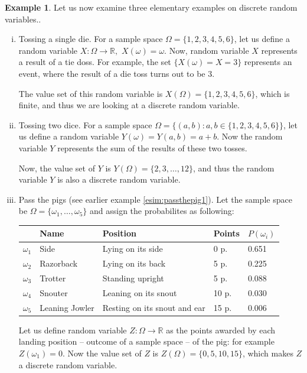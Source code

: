 \documentclass[12pt,a4paper,leqno]{report}
\newcommand{\R}{\mathbb{R}}
\theoremstyle{plain}
\theoremstyle{definition}
\newtheorem{esim}[equation]{Example}
\begin{document}
\begin{esim}
\label{discrete_rv1}
Let us now examine three elementary examples on discrete random variables.. 
\begin{enumerate}[(i)]
\item Tossing a single die. For a sample space $\Omega = \{1,2,3,4,5,6\}$, let us define a random variable $X:\Omega \rightarrow \R, \,\, X(\omega) = \omega$. Now, random variable $X$ represents a result of a tie doss. For example, the set $\lbrace X(\omega)=X=3 \rbrace$ represents an event, where the result of a die toss turns out to be $3$.

The value set of this random variable is $X(\Omega) = \{1,2,3,4,5,6\}$, which is finite, and thus we are looking at a discrete random variable.

\item Tossing two dice. For a sample space $\Omega = \{(a,b) : a,b \in \{1,2,3,4,5,6\}\}$, let us define a random variable $Y(\omega) = Y(a,b) = a + b$. Now the random variable $Y$ represents the sum of the results of these two tosses.

Now, the value set of $Y$ is $Y(\Omega) = \{2,3, \dots , 12\}$, and thus the random variable $Y$ is also a discrete random variable.

\item\label{esim:passthepig2} Pass the pigs (see earlier example \ref{esim:passthepig1}). Let the sample space be $\Omega = \{\omega_1, \dots , \omega_5\}$ and assign the probabilites as following: 
\bigskip

\begin{tabular}{l l L{4cm} l l}
\toprule
& Name & Position & Points & $P(\omega_i)$\\
\midrule
$\omega_1$ & Side & Lying on its side  & 0 p. & 0.651\\
$\omega_2$ & Razorback & Lying on its back & 5 p. & 0.225\\
$\omega_3$ & Trotter & Standing upright & 5 p. & 0.088\\
$\omega_4$ & Snouter & Leaning on its snout & 10 p. & 0.030\\
$\omega_5$ & Leaning Jowler & Resting on its snout and ear & 15 p. &  0.006\\
\bottomrule 
\end{tabular}

\bigskip

Let us define random variable $Z:\Omega \rightarrow \R$ as the points awarded by each landing position -- outcome of a sample space -- of the pig: for example $Z(\omega_1) = 0$. Now the value set of $Z$ is $Z(\Omega) = \{0,5,10,15\}$, which makes $Z$ a discrete random variable.  
\end{enumerate}
\end{esim}
\end{document}

